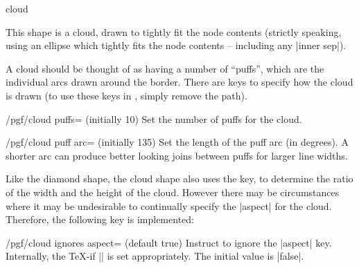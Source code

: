 \begin{shape}{cloud}

	This shape is a cloud, drawn to tightly fit the node contents
	(strictly speaking, using an ellipse which tightly fits the node
	contents -- including any |inner sep|).
	
\begin{codeexample}[]
\end{codeexample}

	A cloud should be thought of as having a number of ``puffs'', which
	are the individual arcs drawn around the border. There are \pgfname{}
	keys to specify how the cloud is drawn (to use these keys in
	\tikzname{}, simply remove the  path).
	
	\begin{key}{/pgf/cloud puffs= (initially 10)}
	  Set the number of puffs for the cloud.
	\end{key}
	
	\begin{key}{/pgf/cloud puff arc= (initially 135)}
	  Set the length of the puff arc (in degrees). A shorter arc can
	  produce better looking joins between puffs for larger line widths.
	\end{key}
	
	Like the diamond shape, the cloud shape also uses the
	 key, to determine the ratio of the width and the
	height of the cloud. However there may be circumstances where it may
	be undesirable to continually specify the |aspect| for the cloud.
	Therefore, the following key is implemented:
	
	\begin{key}{/pgf/cloud ignores aspect= (default true)}
		Instruct \pgfname{} to ignore the |aspect| key. Internally, the
		\TeX-if |\ifpgfcloudignoresaspect| is set appropriately. The initial
		value is |false|.

\begin{codeexample}[]
\end{codeexample}	
	

\end{key}
\end{shape}
